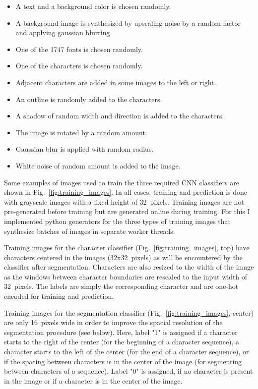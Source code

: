 \documentclass[12pt]{article}
\newcommand\figref[1]{Fig.~\ref{fig:#1}}
\begin{document}
\begin{itemize}
  \itemsep0em
  \item A text and a background color is chosen randomly.
  \item A background image is synthesized by upscaling noise by a random factor and applying gaussian blurring.
  \item One of the 1747 fonts is chosen randomly.
  \item One of the characters is chosen randomly.
  \item Adjacent characters are added in some images to the left or right.
  \item An outline is randomly added to the characters.
  \item A shadow of random width and direction is added to the characters.
  \item The image is rotated by a random amount.
  \item Gaussian blur is applied with random radius.
  \item White noise of random amount is added to the image.
\end{itemize}



Some examples of images used to train the three required CNN classifiers are shown in \figref{training_images}.
%
In all cases, training and prediction is done with grayscale images with a fixed height of 32~pixels.
%
Training images are not pre-generated before training but are generated online during training.
%
For this I implemented python generators for the three types of training images that synthesize
batches of images in separate worker threads.
%


Training images for the character classifier (\figref{training_images}, top) have characters centered in the images (32x32~pixels) as will be encountered
by the classifier after segmentation.
%
Characters are also resized to the width of the image as the windows between character boundaries are rescaled to the
input width of 32~pixels.
%
The labels are simply the corresponding character and are one-hot encoded for training and prediction.


Training images for the segmentation classifier (\figref{training_images}, center) are only 16~pixels wide in order to improve the spacial resolution of the segmentation procedure (see below).
%
Here, label "1" is assigned if a character starts to the right of the center (for the beginning of a character sequence),
a character starts to the left of the center (for the end of a character sequence), or if the spacing
between characters is in the center of the image (for segmenting between characters of a sequence).
%
Label "0" is assigned, if no character is present in the image or if a character is in the center of the image.
\end{document}

